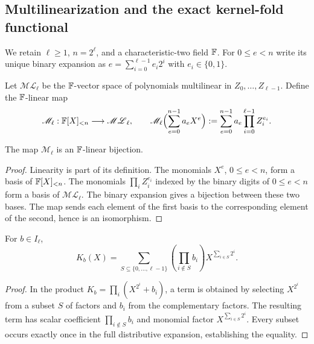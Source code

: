\subsection{Multilinearization and the exact kernel-fold functional}\label{sec:binary:multilinearization}
We retain $\ell\geq1$, $n=2^\ell$, and a characteristic-two field $\mathbb{F}$.
For $0\leq e<n$ write its unique binary expansion as
$e=\sum_{i=0}^{\ell-1}e_i2^i$ with $e_i\in\{0,1\}$.

\begin{definition}\label{def:binary:ml}
Let $\mathscr{ML}_\ell$ be the $\mathbb{F}$-vector space of
polynomials multilinear in $Z_0,\ldots,Z_{\ell-1}$.
Define the $\mathbb{F}$-linear map
\[
 \mathscr M_\ell:\mathbb{F}[X]_{<n}\longrightarrow\mathscr{ML}_\ell,
 \qquad
 \mathscr M_\ell\Bigl(\sum_{e=0}^{n-1}a_eX^e\Bigr)
 :=\sum_{e=0}^{n-1}a_e\prod_{i=0}^{\ell-1}Z_i^{e_i}.
\]
\end{definition}

\begin{lemma}\label{lem:binary:ml-iso}
The map $\mathscr M_\ell$ is an $\mathbb{F}$-linear bijection.
\end{lemma}
\begin{proof}
Linearity is part of its definition. The monomials
$X^e$, $0\leq e<n$, form a basis of $\mathbb{F}[X]_{<n}$.
The monomials $\prod_iZ_i^{e_i}$ indexed by the binary digits of
$0\leq e<n$ form a basis of $\mathscr{ML}_\ell$.
The binary expansion gives a bijection between these two bases.
The map sends each element of the first basis to the corresponding
element of the second, hence is an isomorphism.
\end{proof}

\begin{lemma}\label{lem:binary:kernel-expansion}
For $b\in I_\ell$,
\[
 K_b(X)=\sum_{S\subseteq\{0,\ldots,\ell-1\}}
   \left(\prod_{i\notin S}b_i\right)
   X^{\sum_{i\in S}2^i}.
\]
\end{lemma}
\begin{proof}
In the product $K_b=\prod_i(X^{2^i}+b_i)$,
a term is obtained by selecting $X^{2^i}$ from a subset $S$
of factors and $b_i$ from the complementary factors.
The resulting term has scalar coefficient $\prod_{i\notin S}b_i$
and monomial factor $X^{\sum_{i\in S}2^i}$.
Every subset occurs exactly once in the full distributive
expansion, establishing the equality.
\end{proof}

